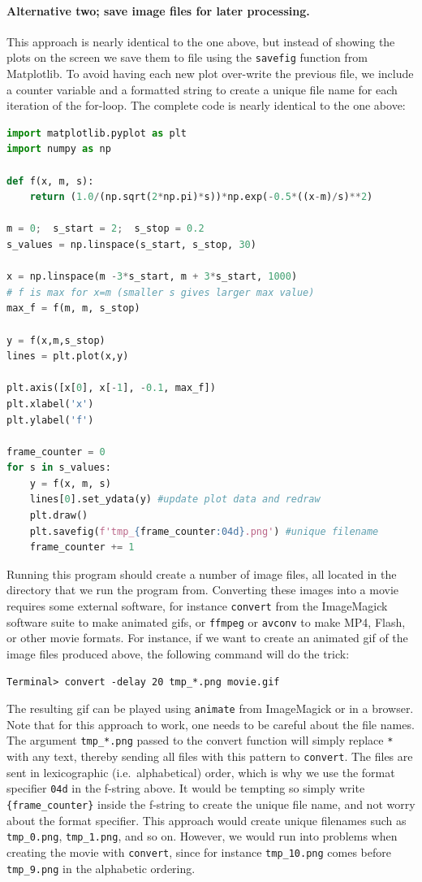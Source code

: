 \documentclass[graybox,envcountchap,sectrefs,final]{svmonodo}
\begin{document}
\paragraph{Alternative two; save image files for later processing.}
This approach is nearly identical to the one above, but instead of showing the plots on the screen
we save them to file using the \texttt{savefig} function from Matplotlib. To avoid having each new plot over-write
the previous file, we include a counter variable and
a formatted string to create a unique file name for each iteration of the for-loop. The complete code is nearly
identical to the one above:
\begin{lstlisting}[language=Python,style=blue1]
import matplotlib.pyplot as plt
import numpy as np

def f(x, m, s):
    return (1.0/(np.sqrt(2*np.pi)*s))*np.exp(-0.5*((x-m)/s)**2)

m = 0;  s_start = 2;  s_stop = 0.2
s_values = np.linspace(s_start, s_stop, 30)

x = np.linspace(m -3*s_start, m + 3*s_start, 1000)
# f is max for x=m (smaller s gives larger max value)
max_f = f(m, m, s_stop)

y = f(x,m,s_stop)
lines = plt.plot(x,y)

plt.axis([x[0], x[-1], -0.1, max_f])
plt.xlabel('x')
plt.ylabel('f')

frame_counter = 0
for s in s_values:
    y = f(x, m, s)
    lines[0].set_ydata(y) #update plot data and redraw
    plt.draw()
    plt.savefig(f'tmp_{frame_counter:04d}.png') #unique filename
    frame_counter += 1
\end{lstlisting}
Running this program should create a number of image files, all located in the directory that we run the
program from. Converting these images into a movie requires some external software, for instance
\texttt{convert} from the ImageMagick software suite to make animated gifs, or \texttt{ffmpeg} or \texttt{avconv}
to make MP4, Flash, or other movie formats. For instance, if we want to create an animated gif of the
image files produced above, the following command will do the trick:
\begin{Verbatim}[frame=lines,label=\fbox{{\tiny Terminal}},framesep=2.5mm,framerule=0.7pt]
Terminal> convert -delay 20 tmp_*.png movie.gif
\end{Verbatim}
The resulting gif can be played using \texttt{animate} from ImageMagick or in a browser. Note that for
this approach to work, one needs to be careful about the file names. The argument \Verb!tmp_*.png! passed
to the convert function will simply replace \texttt{*} with any text, thereby sending all files with this pattern
to \texttt{convert}. The files are sent in lexicographic (i.e.~alphabetical) order, which is why we use the format
specifier \texttt{04d} in the f-string above. It would be tempting so simply write \Verb!{frame_counter}! inside the
f-string to create the unique file name, and not worry about the format specifier. This approach would create
unique filenames such as \Verb!tmp_0.png!, \Verb!tmp_1.png!, and so on. However, we would
run into problems when creating the movie with \texttt{convert}, since for instance \Verb!tmp_10.png! comes before \Verb!tmp_9.png!
in the alphabetic ordering.
\end{document}
